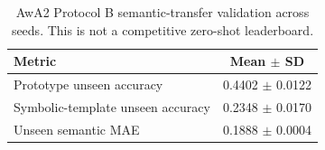 \begin{table}[H]
\caption{AwA2 Protocol B semantic-transfer validation across seeds. This is not a competitive zero-shot leaderboard.\label{tab:protocol_b_seedwise}}
\centering
\small
\begin{tabular}{lc}
\toprule
Metric & Mean $\pm$ SD \\
\midrule
Prototype unseen accuracy & 0.4402 $\pm$ 0.0122 \\
Symbolic-template unseen accuracy & 0.2348 $\pm$ 0.0170 \\
Unseen semantic MAE & 0.1888 $\pm$ 0.0004 \\
\bottomrule
\end{tabular}
\end{table}
